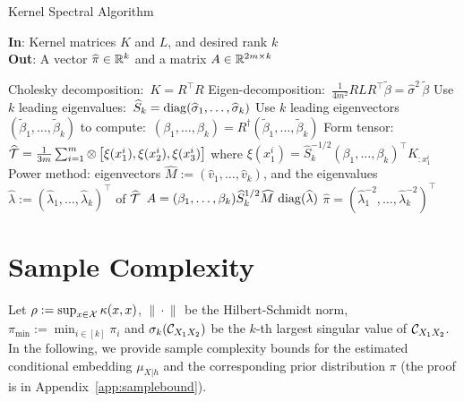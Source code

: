 \documentclass{article}
\begin{document}
\begin{algorithm}[t!]
\caption{Kernel Spectral Algorithm}
 	\textbf{In}: Kernel matrices $K$ and $L$, and desired rank $k$ \\
	\textbf{Out}: A vector $\widehat \pi \in \mathbb{R}^k$ and a matrix $A \in \mathbb{R}^{2m\times k}$\\[-0.4cm]
  \begin{algorithmic}[1]
    \STATE Cholesky decomposition:\ $K=R^\top R$
    \STATE Eigen-decomposition:\ $\frac{1}{4m^2} R L R^\top \widetilde{\beta} = \widehat \sigma^2\,\widetilde{\beta}$
    \STATE Use $k$ leading eigenvalues:\ $\widehat S_k = \mathop{\mathrm{diag}}(\widehat \sigma_1,\ldots,\widehat \sigma_k)$
    \STATE Use $k$ leading eigenvectors $(\widetilde{\beta}_1,\ldots,\widetilde{\beta}_k)$ to
    compute:\ $(\beta_1,\ldots,\beta_k) = R^\dagger (\widetilde{\beta}_1,\ldots,\widetilde{\beta}_k)$
		\STATE Form tensor: $\widehat {{\mathcal{T}}} = \frac{1}{3m}\sum\nolimits_{i=1}^m \otimes\left[\xi(x_1^i), \xi(x_2^i), \xi(x_3^i)\right]$ where $\xi(x_1^i) = \widehat S_k^{-1/2} (\beta_1,\ldots,\beta_k)^\top K_{:x_1^i}$
		\STATE Power method: eigenvectors $\widehat M:=(\widehat v_1,\ldots,\widehat v_k)$, and the eigenvalues $\widehat \lambda := (\widehat\lambda_1,\ldots,\widehat\lambda_k)^\top$ of $\widehat {{\mathcal{T}}}$
		\STATE $A = (\beta_1,\ldots,\beta_k) \widehat  S_k^{1/2} \widehat M \, \mathop{\mathrm{diag}}(\widehat \lambda)$
		\STATE $\widehat \pi = (\widehat\lambda_1^{-2},\ldots,\widehat\lambda_k^{-2})^\top$
  \end{algorithmic}
  \label{alg:multiview}
\end{algorithm}

\vspace{-3mm}
\section{Sample Complexity}
\vspace{-2mm}

Let $\rho:=\sup_{x \in \mathcal{X}} \kappa(x,x)$,   $\| \cdot\|_{}$ be the Hilbert-Schmidt norm, $\pi_{\min}:=\min_{i\in [k]} \pi_i$ and $\sigma_k(\mathcal{C}_{X_1X_2})$ be the $k$-th largest singular value of $\mathcal{C}_{X_1X_2}$. In the following, we provide sample complexity bounds for the estimated conditional embedding $\mu_{X|h}$ and the corresponding prior distribution $\pi$ (the proof is in Appendix~\ref{app:samplebound}).
\end{document}
